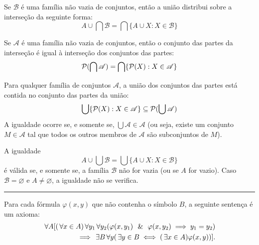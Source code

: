 \begin{proposicao}
    \label{prop:distributiva_uniao_intersecao_familia}
    Se \(\mathscr{B}\) é uma família não vazia de conjuntos, então a união distribui sobre a interseção da seguinte forma:
    \[ A \cup \bigcap \mathscr{B} = \bigcap \{ A \cup X: X \in \mathscr{B} \} \]
\end{proposicao}

\begin{proposicao}
    \label{prop:partes_intersecao_familia}
    Se \(\mathscr{A}\) é uma família não vazia de conjuntos, então o conjunto das partes da interseção é igual à interseção dos conjuntos das partes:
    \[ \mathcal{P}(\bigcap \mathscr{A}) = \bigcap \{ \mathcal{P}(X): X \in \mathscr{A} \} \]
\end{proposicao}

\begin{proposicao}
    \label{prop:uniao_partes_inclusao_familia}
    Para qualquer família de conjuntos \(\mathscr{A}\), a união dos conjuntos das partes está contida no conjunto das partes da união:
    \[ \bigcup \{ \mathcal{P}(X): X \in \mathscr{A} \} \subseteq \mathcal{P}(\bigcup \mathscr{A}) \]
    A igualdade ocorre se, e somente se, \(\bigcup \mathscr{A} \in \mathscr{A}\) (ou seja, existe um conjunto \(M \in \mathscr{A}\) tal que todos os outros membros de \(\mathscr{A}\) são subconjuntos de \(M\)).
\end{proposicao}

\begin{proposicao}
    \label{prop:distributiva_uniao_familia_condicao}
    A igualdade
    \[ A \cup \bigcup \mathscr{B} = \bigcup \{ A \cup X: X \in \mathscr{B} \} \]
    é válida se, e somente se, a família \(\mathscr{B}\) não for vazia (ou se \(A\) for vazio). Caso \(\mathscr{B} = \varnothing\) e \(A \neq \varnothing\), a igualdade não se verifica.
\end{proposicao}

\hrule

\begin{axioma}
    \label{ax:substituicao}
    Para cada fórmula \(\varphi(x,y)\) que não contenha o símbolo \(B\), a seguinte sentença é um axioma:
    \begin{align*}
        \forall A [(\forall x \in A) \forall y_1 \forall y_2 (\varphi(x, y_1) \e \varphi(x, y_2) \implies y_1 = y_2) \\
                \implies \exists B \forall y (\exists y \in B \iff (\exists x \in A)\varphi(x, y))].
    \end{align*}
\end{axioma}

